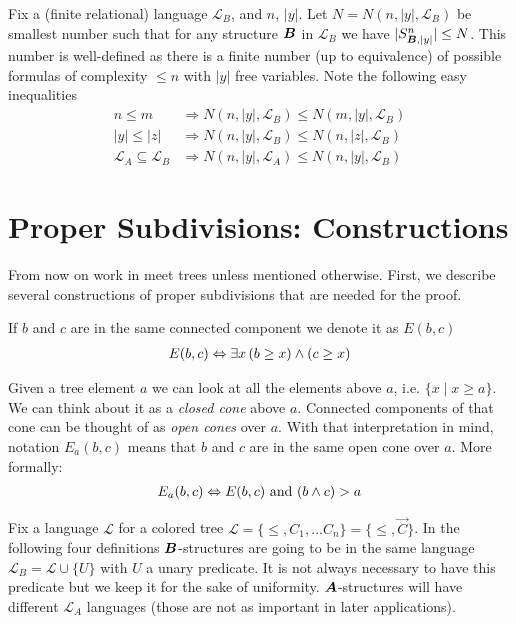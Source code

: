 \documentclass{amsart}
\DeclareMathOperator{\TT}{\boldface T}
\DeclareMathOperator{\A}{\boldface A}
\DeclareMathOperator{\B}{\boldface B}
\renewcommand{\LL}{\mathcal L}
\begin{document}
\begin{Definition} \label{def_type_count}
	Fix a (finite relational) language $\LL_B$, and $n$, $|y|$. Let $N = N(n, |y|, \LL_B)$ be smallest number such that for any structure $\B$ in $\LL_B$ we have $|S^n_{\B, |y|}| \leq N$. This number is well-defined as there is a finite number (up to equivalence) of possible formulas of complexity $\leq n$ with $|y|$ free variables. Note the following easy inequalities
	\begin{align*}
		n \leq m &\Rightarrow N(n, |y|, \LL_B) \leq N(m, |y|, \LL_B) \\
		|y| \leq |z| &\Rightarrow N(n, |y|, \LL_B) \leq N(n, |z|, \LL_B) \\
		\LL_A \subseteq \LL_B &\Rightarrow N(n, |y|, \LL_A) \leq N(n, |y|, \LL_B)
	\end{align*}
\end{Definition}

\section{Proper Subdivisions: Constructions}

From now on work in meet trees unless mentioned otherwise. First, we describe several constructions of proper subdivisions that are needed for the proof. 

\begin{Definition}
	If $b$ and $c$ are in the same connected component we denote it as $E(b, c)$ 
	\begin{align*}
		E(b, c) \Leftrightarrow \exists x \, (b \geq x) \wedge (c \geq x)
	\end{align*}
\end{Definition}
\begin{Definition}
	Given a tree element $a$ we can look at all the elements above $a$, i.e. $\{x \mid x \geq a\}$. We can think about it as a \emph{closed cone} above $a$. Connected components of that cone can be thought of as \emph{open cones} over $a$. With that interpretation in mind, notation $E_a(b, c)$ means that $b$ and $c$ are in the same open cone over $a$. More formally:
	\begin{align*}
		E_a(b, c) \Leftrightarrow E(b,c) \text{ and } (b \wedge c) > a
	\end{align*}
\end{Definition}

Fix a language $\LL$ for a colored tree $\LL = \{\leq, C_1, \ldots C_n\} = \{\leq, \vec C\}$. In the following four definitions $\B$-structures are going to be in the same language $\LL_B = \LL \cup \{U\}$ with $U$ a unary predicate. It is not always necessary to have this predicate but we keep it for the sake of uniformity. $\A$-structures will have different $\LL_A$ languages (those are not as important in later applications).
\end{document}
